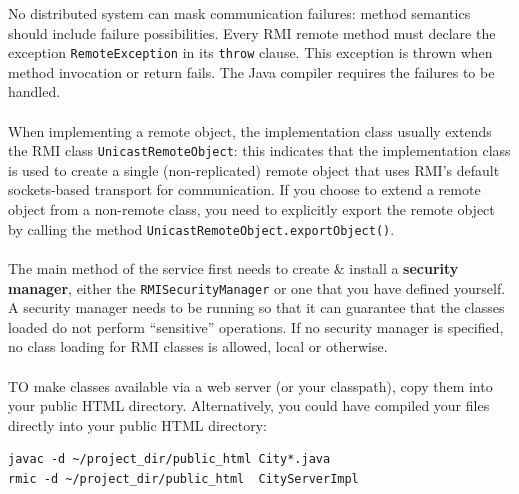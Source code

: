 \documentclass[a4paper,11pt]{article}
\begin{document}
No distributed system can mask communication failures: method semantics should include failure possibilities.
Every RMI remote method must declare the exception \texttt{RemoteException} in its \texttt{throw} clause.
This exception is thrown when method invocation or return fails.
The Java compiler requires the failures to be handled.
\\\\
When implementing a remote object, the implementation class usually extends the RMI class \texttt{UnicastRemoteObject}: this indicates that the implementation class is used to create a single (non-replicated) remote object that uses RMI's default sockets-based transport for communication.
If you choose to extend a remote object from a non-remote class, you need to explicitly export the remote object by calling the method \texttt{UnicastRemoteObject.exportObject()}.
\\\\
The main method of the service first needs to create \& install a \textbf{security manager}, either the \texttt{RMISecurityManager} or one that you have defined yourself.
A security manager needs to be running so that it can guarantee that the classes loaded do not perform ``sensitive'' operations.
If no security manager is specified, no class loading for RMI classes is allowed, local or otherwise.
\\\\
TO make classes available via a web server (or your classpath), copy them into your public HTML directory.
Alternatively, you could have compiled your files directly into your public HTML directory:
\begin{verbatim}
javac -d ~/project_dir/public_html City*.java
rmic -d ~/project_dir/public_html  CityServerImpl
\end{verbatim}
\end{document}
